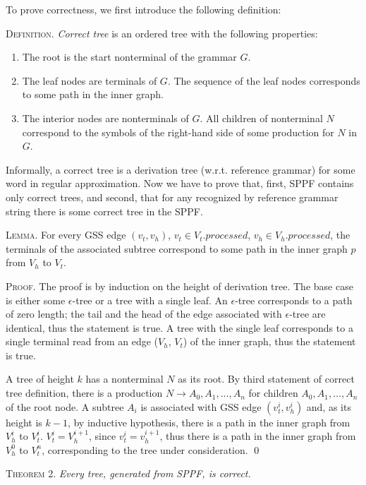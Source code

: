 To prove correctness, we first introduce the following definition:

\textsc{Definition.} 
\emph{Correct tree} is an ordered tree with the following properties:
\begin{enumerate}
  \item The root is the start nonterminal of the grammar $G$.
  \item The leaf nodes are terminals of $G$. The sequence of the leaf nodes 
        corresponds to some path in the inner graph. 
  \item The interior nodes are nonterminals of $G$. All children of nonterminal 
        $N$ correspond to the symbols of the right-hand side of some production for $N$ in $G$.
\end{enumerate}

Informally, a correct tree is a derivation tree (w.r.t. reference grammar) for some word in 
regular approximation. Now we have to prove that, first, SPPF contains only correct trees, 
and second, that for any recognized by reference grammar string there is some correct tree in
the SPPF.

\textsc{Lemma.}
For every GSS edge $(v_{t}, v_{h})$, $v_{t} \in V_{t}.processed$, $v_{h} \in V_{h}.processed$, 
the terminals of the associated subtree correspond to some path in the inner graph $p$ 
from $V_{h}$ to $V_{t}$.

\textsc{Proof.}
The proof is by induction on the height of derivation tree. 
The base case is either some $\epsilon$-tree or a tree with a single leaf. An $\epsilon$-tree corresponds 
to a path of zero length; the tail and the head of the edge associated with $\epsilon$-tree are identical, 
thus the statement is true. A tree with the single leaf corresponds to a single terminal read from an edge 
($V_{h}$, $V_{t}$) of the inner graph, thus the statement is true.

A tree of height $k$ has a nonterminal $N$ as its root. By third statement of correct tree definition, 
there is a production $N \rightarrow A_{0}, A_{1}, \dots, A_{n}$ for children $A_{0}, A_{1}, \dots, A_{n}$ of the root node. 
A subtree $A_{i}$ is associated with GSS edge $(v_{t}^{i}, v_{h}^{i})$ and, as its height is $k-1$, by inductive hypothesis,
there is a path in the inner graph from $V_{h}^{i}$ to $V_{t}^{i}$. $V_{t}^i = V_{h}^{i+1}$, since $v_{t}^i = v_{h}^{i+1}$, 
thus there is a path in the inner graph from $V_{h}^{0}$ to $V_{t}^{n}$, corresponding to the tree under consideration.
\qed

\textsc{Theorem 2.} 
\textit{Every tree, generated from SPPF, is correct.}

